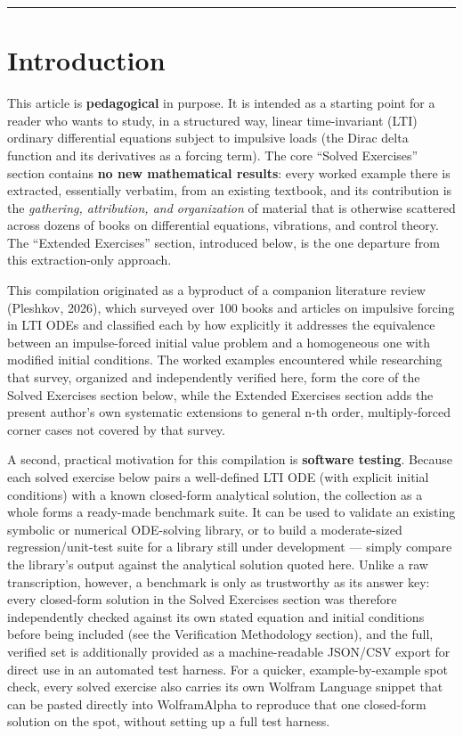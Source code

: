 \documentclass[
  11pt,
]{article}
\begin{document}
\begin{center}\rule{0.5\linewidth}{0.5pt}\end{center}

\hypertarget{introduction}{%
\section{Introduction}\label{introduction}}

This article is \textbf{pedagogical} in purpose. It is intended as a
starting point for a reader who wants to study, in a structured way,
linear time-invariant (LTI) ordinary differential equations subject to
impulsive loads (the Dirac delta function and its derivatives as a
forcing term). The core ``Solved Exercises'' section contains \textbf{no
new mathematical results}: every worked example there is extracted,
essentially verbatim, from an existing textbook, and its contribution is
the \emph{gathering, attribution, and organization} of material that is
otherwise scattered across dozens of books on differential equations,
vibrations, and control theory. The ``Extended Exercises'' section,
introduced below, is the one departure from this extraction-only
approach.

This compilation originated as a byproduct of a companion literature
review (Pleshkov, 2026), which surveyed over 100 books and articles on
impulsive forcing in LTI ODEs and classified each by how explicitly it
addresses the equivalence between an impulse-forced initial value
problem and a homogeneous one with modified initial conditions. The
worked examples encountered while researching that survey, organized and
independently verified here, form the core of the Solved Exercises
section below, while the Extended Exercises section adds the present
author's own systematic extensions to general n-th order,
multiply-forced corner cases not covered by that survey.

A second, practical motivation for this compilation is \textbf{software
testing}. Because each solved exercise below pairs a well-defined LTI
ODE (with explicit initial conditions) with a known closed-form
analytical solution, the collection as a whole forms a ready-made
benchmark suite. It can be used to validate an existing symbolic or
numerical ODE-solving library, or to build a moderate-sized
regression/unit-test suite for a library still under development ---
simply compare the library's output against the analytical solution
quoted here. Unlike a raw transcription, however, a benchmark is only as
trustworthy as its answer key: every closed-form solution in the Solved
Exercises section was therefore independently checked against its own
stated equation and initial conditions before being included (see the
Verification Methodology section), and the full, verified set is
additionally provided as a machine-readable JSON/CSV export for direct
use in an automated test harness. For a quicker, example-by-example spot
check, every solved exercise also carries its own Wolfram Language
snippet that can be pasted directly into WolframAlpha to reproduce that
one closed-form solution on the spot, without setting up a full test
harness.
\end{document}
